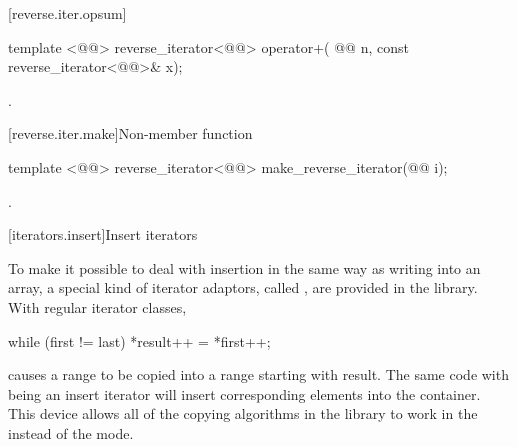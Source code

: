 [reverse.iter.opsum]{}

%
\begin{itemdecl}
template <@@>
  reverse_iterator<@@>
    operator+(
  @@ n,
  const reverse_iterator<@@>& x);
\end{itemdecl}

\begin{itemdescr}
\pnum
\oldoldtxt{\returns}
.
\end{itemdescr}

[reverse.iter.make]{Non-member function }

%
\begin{itemdecl}
template <@@>
  reverse_iterator<@@> make_reverse_iterator(@@ i);
\end{itemdecl}

\begin{itemdescr}
\pnum
\returns
{}.
\end{itemdescr}

[iterators.insert]{Insert iterators}

\pnum
To make it possible to deal with insertion in the same way as writing into an array, a special kind of iterator
adaptors, called
,
are provided in the library.
With regular iterator classes,

\begin{codeblock}
while (first != last) *result++ = *first++;
\end{codeblock}

causes a range 
to be copied into a range starting with result.
The same code with
being an insert iterator will insert corresponding elements into the container.
This device allows all of the
copying algorithms in the library to work in the
instead of the  mode.

